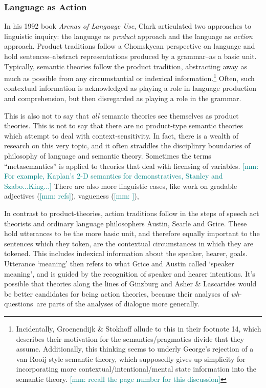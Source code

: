 \documentclass[12pt,letterpaper,table,svgnames,dvipsnames]{article}
\newcommand{\mm}[1]{\textcolor{teal}{[mm: #1]}}
\newcommand{\whqs}{\emph{wh}-questions~}
\begin{document}
\subsubsection{Language as Action}
In his 1992 book \emph{Arenas of Language Use}, Clark articulated two approaches to linguistic inquiry: the language as \emph{product} approach and the language as \emph{action} approach. Product traditions follow a Chomskyean perspective on language and hold sentences--abstract representations produced by a grammar--as a basic unit. Typically, semantic theories follow the product tradition, abstracting away as much as possible from any circumstantial or indexical information.\footnote{Incidentally, Groenendijk \& Stokhoff allude to this in their footnote 14, which describes their motivation for the semantics/pragmatics divide that they assume. Additionally, this thinking seems to underly George's rejection of a van Rooij style semantic theory, which supposedly gives up simplicity for incorporating more contextual/intentional/mental state information into the semantic theory. \mm{recall the page number for this discussion}} Often, such contextual information is acknowledged as playing a role in language production and comprehension, but then disregarded as playing a role in the grammar.

This is also not to say that \emph{all} semantic theories see themselves as product theories. This is not to say that there are no product-type semantic theories which attempt to deal with context-sensitivity. In fact, there is a wealth of research on this very topic, and it often straddles the disciplinry boundaries of philosophy of language and semantic theory. Sometimes the terms ``metasemantics'' is applied to theories that deal with licensing of variables. \mm{For example, Kaplan's 2-D semantics for demonstratives, Stanley and Szabo...King...} There are also more linguistic cases, like work on gradable adjectives (\mm{refs}), vagueness (\mm{}), 


In contrast to product-theories, action traditions follow in the steps of speech act theorists and ordinary language philosophers Austin, Searle and Grice. These hold utterances to be the more basic unit, and therefore equally important to the sentences which they token, are the contextual circumstances in which they are tokened. This includes indexical information about the speaker, hearer, goals. Utterance `meaning' then refers to what Grice and Austin called `speaker meaning', and is guided by the recognition of speaker and hearer intentions. It's possible that theories along the lines of Ginzburg and Asher \& Lascarides would be better candidates for being action theories, because their analyses of \whqs are parts of the analyses of dialogue more generally. 
\end{document}
